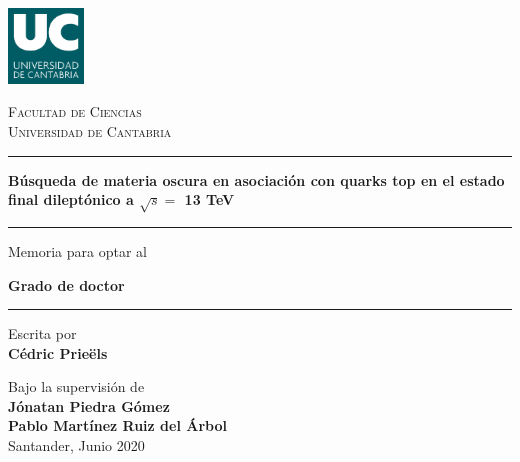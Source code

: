 \documentclass[a4paper, 10pt, openright]{report}
\begin{document}

\thispagestyle{empty}
\phantom{a}
\vfill
\newpage

\begin{titlepage}

	\centering
	\includegraphics[width=0.15\textwidth]{figs/image_UC.png}\par
	{\scshape\LARGE Facultad de Ciencias \\ \vspace{-15pt} Universidad de Cantabria \par}
	
	\vspace{0.8cm}
	
	\noindent\rule{15cm}{0.4pt}\par 
	{\huge\bfseries B\'{u}squeda de materia oscura en asociaci\'{o}n con quarks top en el estado final dilept\'{o}nico a $\sqrt{s} = $ 13 TeV\par \vspace{10pt}}
	\noindent\rule{15cm}{0.4pt}\par 
	
	{\vspace{20pt} \Large Memoria para optar al \par \LARGE \textbf{Grado de doctor} \vspace{20pt} \par \noindent\rule{15cm}{0.4pt}}
	
	\vspace{0.8cm}
	{\Large Escrita por \\ \textbf{C\'{e}dric Prie\"{e}ls}\par}
	\vspace{0.5cm}
	{\Large Bajo la supervisi\'{o}n de \\ \textbf{J\'{o}natan Piedra G\'{o}mez} \\
	\vspace{-10pt}
	\textbf{Pablo Mart\'{i}nez Ruiz del \'{A}rbol}\\}
	\vspace{1.4cm}
	{\Large Santander, Junio 2020}
	\vfill

\end{titlepage}


\thispagestyle{empty}
\phantom{a}
\vfill
\newpage
\end{document}
